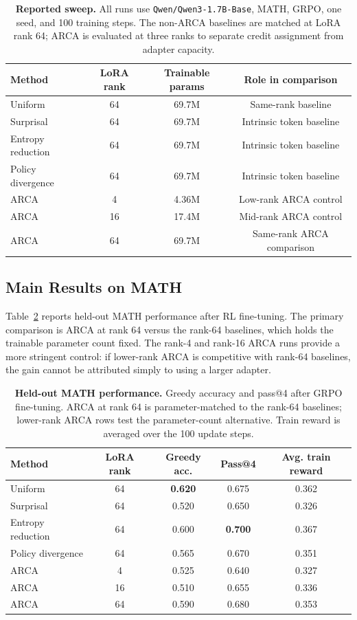 \begin{table}[t]
\centering
\caption{\textbf{Reported sweep.} All runs use
\texttt{Qwen/Qwen3-1.7B-Base}, MATH, GRPO, one seed, and 100 training steps.
The non-ARCA baselines are matched at LoRA rank 64; ARCA is evaluated at
three ranks to separate credit assignment from adapter capacity.}
\label{tab:sweep}
\begin{tabular}{l c c c}
\toprule
Method & LoRA rank & Trainable params & Role in comparison \\
\midrule
Uniform & 64 & 69.7M & Same-rank baseline \\
Surprisal & 64 & 69.7M & Intrinsic token baseline \\
Entropy reduction & 64 & 69.7M & Intrinsic token baseline \\
Policy divergence & 64 & 69.7M & Intrinsic token baseline \\
ARCA & 4 & 4.36M & Low-rank ARCA control \\
ARCA & 16 & 17.4M & Mid-rank ARCA control \\
ARCA & 64 & 69.7M & Same-rank ARCA comparison \\
\bottomrule
\end{tabular}
\end{table}

\subsection{Main Results on MATH}

Table~\ref{tab:math-results} reports held-out MATH performance after RL
fine-tuning. The primary comparison is ARCA at rank 64 versus the rank-64
baselines, which holds the trainable parameter count fixed. The rank-4 and
rank-16 ARCA runs provide a more stringent control: if lower-rank ARCA is
competitive with rank-64 baselines, the gain cannot be attributed simply to
using a larger adapter.

\begin{table}[t]
\centering
\caption{\textbf{Held-out MATH performance.} Greedy accuracy and pass@4
after GRPO fine-tuning. ARCA at rank 64 is parameter-matched to the
rank-64 baselines; lower-rank ARCA rows test the parameter-count
alternative. Train reward is averaged over the 100 update steps.}
\label{tab:math-results}
\begin{tabular}{l c c c c}
\toprule
Method & LoRA rank & Greedy acc. & Pass@4 & Avg. train reward \\
\midrule
Uniform & 64 & \textbf{0.620} & 0.675 & 0.362 \\
Surprisal & 64 & 0.520 & 0.650 & 0.326 \\
Entropy reduction & 64 & 0.600 & \textbf{0.700} & 0.367 \\
Policy divergence & 64 & 0.565 & 0.670 & 0.351 \\
ARCA & 4 & 0.525 & 0.640 & 0.327 \\
ARCA & 16 & 0.510 & 0.655 & 0.336 \\
ARCA & 64 & 0.590 & 0.680 & 0.353 \\
\bottomrule
\end{tabular}
\end{table}

